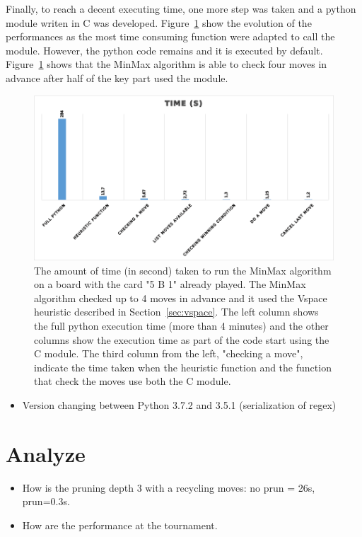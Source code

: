 \documentclass[runningheads]{llncs}
\begin{document}
Finally, to reach a decent executing time, 
one more step was taken and a python module writen
in C was developed.
Figure~\ref{fig:performance-magic} show the
evolution of the performances as the most time
consuming function were adapted to call the
module. However, the python code remains and it is
executed by default. 
Figure~\ref{fig:performance-magic} shows that the
MinMax algorithm is able to check four moves in
advance after half of the key part used the
module.

\begin{figure}
		\includegraphics[width=\textwidth]{perfromances.png}
		\caption{The amount of time (in second) taken
		to run the MinMax algorithm on a board with the
		card "5 B 1" already played. The MinMax
		algorithm checked up to 4 moves in advance and
		it used the Vspace heuristic described in
		Section~\ref{sec:vspace}. The left column
		shows the full python execution time (more
		than 4 minutes) and the other columns show the
		execution time as part of the code start using
		the C module. The third column from the left,
		"checking a move", indicate the time taken
		when the heuristic function and the function
		that check the moves use both the C module.}
		\label{fig:performance-magic}
\end{figure}

\begin{itemize}
		\item Version changing between Python 3.7.2 and 3.5.1 (serialization of regex)
\end{itemize}
\section{Analyze}
\begin{itemize}
		\item How is the pruning depth 3 with a
				recycling moves: no prun = 26s, prun=0.3s.
		\item How are the performance at the tournament.
\end{itemize}
\end{document}
